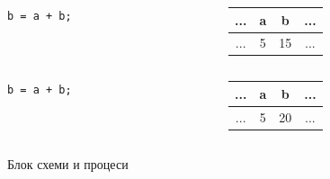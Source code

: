 \documentclass{beamer}
\begin{document}
\begin{frame}[fragile]
\begin{columns}[c]
\begin{column}{0.7\textwidth}
\begin{tabular}{ c | c | c | c}
\end{tabular}

  \end{column}
\end{columns}

\pause

\begin{columns}[c]
  \begin{column}{0.3\textwidth}
\begin{lstlisting}
b = a + b;
\end{lstlisting}

  \end{column}
  \begin{column}{0.7\textwidth}
\begin{tabular}{ c | c | c | c}
\hline
... & a & b &  ...\\\hline
... & 5 & \alert{15} & ... \\\hline
  
\end{tabular}

  \end{column}
\end{columns}

\pause

\begin{columns}[c]
  \begin{column}{0.3\textwidth}
\begin{lstlisting}
b = a + b;
\end{lstlisting}

  \end{column}
  \begin{column}{0.7\textwidth}
\begin{tabular}{ c | c | c | c}
\hline
... & a & b &  ...\\\hline
... & 5 & \alert{20} & ... \\\hline
  
\end{tabular}

  \end{column}
\end{columns}

\end{frame}


\begin{frame}
\centerline{Блок схеми и процеси}
\end{frame}
\end{document}
